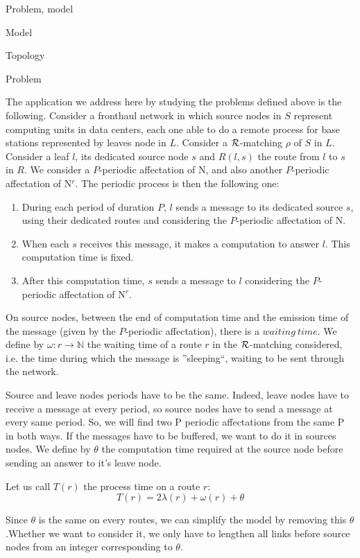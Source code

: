 \documentclass[a4paper,10pt]{report}
\begin{document}
\begin{chapter}{Problem, model}
\begin{section}{Model}
\begin{subsection}{Topology}
\end{subsection}

\end{section}
\begin{section}{Problem}
   
The application we address here by studying the problems defined above is the following. Consider a fronthaul network in which source nodes in $S$ represent computing units in data centers,
each one able to do a remote process for base stations represented by leaves node in $L$. Consider a ${\cal R}$-matching $\rho$ of $S$ in $L$. Consider a leaf $l$, its dedicated source node $s$
and $R(l,s)$ the route from $l$ to $s$ in $R$. We consider a $P$-periodic affectation of N, and also another $P$-periodic affectation of N$^{r}$.
The periodic process is then the following one:
\begin{enumerate}
 \item During each period of duration $P$, $l$ sends a message to its dedicated source $s$, using their dedicated routes and considering the $P$-periodic affectation of N. 
 \item When each $s$ receives this message, it makes a computation to answer $l$. This computation time is fixed.
 \item After this computation time, $s$ sends a message to $l$ considering the $P$-periodic affectation of N$^{r}$.
\end{enumerate}
On source nodes, between the end of computation time and the emission time of the message (given by the $P$-periodic affectation), there is a $waiting\:time$. 
We define by $\omega : r \rightarrow \mathbb{N}$ the waiting time of a route $r$ in the ${\cal R}$-matching considered, i.e. the time during which the
message is ''sleeping``, waiting to be sent through the network.


Source and leave nodes periods have to be the same. Indeed, leave nodes have to receive a message at every period, so source nodes have to send a message at every same period.
So, we will find two P periodic affectations from the same P in both ways. 
If the messages have to be buffered, we want to do it in sources nodes.
We define by $\theta$ the computation time required at the source node before sending an answer to it's leave node.

Let us call $T (r)$ the process time on a route $r$: $$ T (r) = 2\lambda (r) + \omega (r) + \theta$$

Since $\theta$ is the same on every routes, we can simplify the model by removing this $\theta$.Whether we want to consider it, we only have to lengthen all 
links before source nodes from an integer corresponding to $\theta$. 



\end{section}
\end{chapter}
\end{document}
